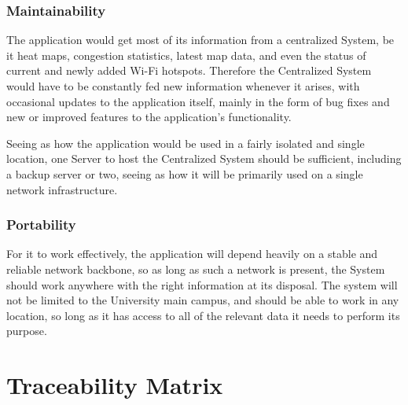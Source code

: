 \documentclass[11pt]{article}
\begin{document}
		

		\subsubsection{Maintainability}

		The application would get most of its information from a centralized System, be it heat maps, congestion statistics, latest map data, and even the status of current and newly added Wi-Fi hotspots.  Therefore the Centralized System would have to be constantly fed new information whenever it arises, with occasional updates to the application itself, mainly in the form of bug fixes and new or improved features to the application’s functionality.  

		

		Seeing as how the application would be used in a fairly isolated and single location, one Server to host the Centralized System should be sufficient, including a backup server or two, seeing as how it will be primarily used on a single network infrastructure.  

		

		\subsubsection{Portability}

		For it to work effectively, the application will depend heavily on a stable and reliable network backbone, so as long as such a network is present, the System should work anywhere with the right information at its disposal.  The system will not be limited to the University main campus, and should be able to work in any location, so long as it has access to all of the relevant data it needs to perform its purpose.  

		
\section{Traceability Matrix}
\end{document}
